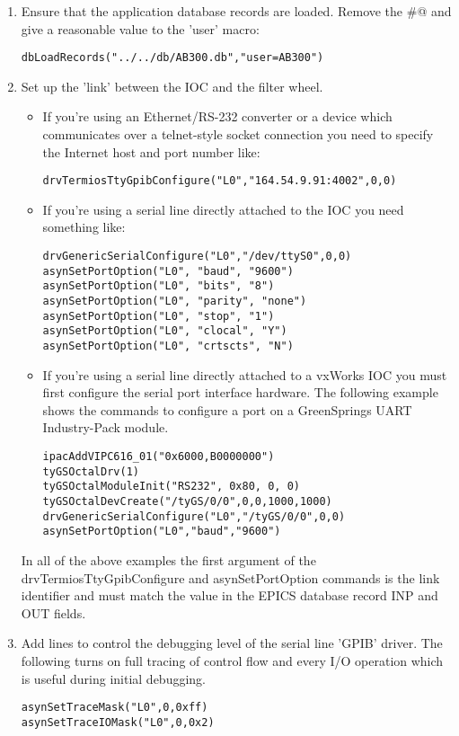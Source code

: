 \documentclass[twoside]{article}
\begin{document}
\begin{enumerate}
\item Ensure that the application database records are loaded.  Remove the
\verb@#@
and give a reasonable value to the 'user' macro:
\begin{verbatim}
dbLoadRecords("../../db/AB300.db","user=AB300")
\end{verbatim}

\item Set up the 'link' between the IOC and the filter wheel.
\begin{itemize}
\item If you're using
an Ethernet/RS-232 converter or a device which communicates over
a telnet-style socket connection you need to specify the Internet host and
port number like:
\begin{verbatim}
drvTermiosTtyGpibConfigure("L0","164.54.9.91:4002",0,0)
\end{verbatim}


\item If you're using a serial line directly attached to the IOC you need
something like:
\begin{verbatim}
drvGenericSerialConfigure("L0","/dev/ttyS0",0,0)
asynSetPortOption("L0", "baud", "9600")
asynSetPortOption("L0", "bits", "8")
asynSetPortOption("L0", "parity", "none")
asynSetPortOption("L0", "stop", "1")
asynSetPortOption("L0", "clocal", "Y")
asynSetPortOption("L0", "crtscts", "N")
\end{verbatim}

\item If you're using a serial line directly attached to a vxWorks IOC you must
first configure the serial port interface hardware.  The following example shows the
commands to configure a port on a GreenSprings UART Industry-Pack module.
\begin{verbatim}
ipacAddVIPC616_01("0x6000,B0000000")
tyGSOctalDrv(1)
tyGSOctalModuleInit("RS232", 0x80, 0, 0)
tyGSOctalDevCreate("/tyGS/0/0",0,0,1000,1000)
drvGenericSerialConfigure("L0","/tyGS/0/0",0,0)
asynSetPortOption("L0","baud","9600")
\end{verbatim}
\end{itemize}

In all of the above examples the first argument of the
drvTermiosTtyGpibConfigure and asynSetPortOption commands is
the link identifier and must match the \verb@L@ value in the EPICS
database record INP and OUT fields.

\item Add lines to control the debugging level of the serial line 'GPIB' driver.
The following turns on full tracing of control flow and every I/O operation
which is useful during initial debugging.
\begin{verbatim}
asynSetTraceMask("L0",0,0xff)
asynSetTraceIOMask("L0",0,0x2)
\end{verbatim}

\end{enumerate}
\end{document}
